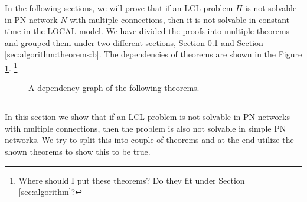 
In the following sections, we will prove that if an LCL problem $\Pi$ is not solvable in PN network $N$ with multiple connections, then it is not solvable in constant time in the LOCAL model.
We have divided the proofs into multiple theorems and grouped them under two different sections, Section \ref{sec:algorithm:theorems:a} and Section \ref{sec:algorithm:theorems:b}.
The dependencies of theorems are shown in the Figure \ref{fig:algorithm:theorem_dependency}.
\footnote{Where should I put these theorems? Do they fit under Section \ref{sec:algorithm}?}

\begin{figure}[H]
    \centering
    \caption{A dependency graph of the following theorems.\label{fig:algorithm:theorem_dependency}}
\end{figure}

\subsection{} \label{sec:algorithm:theorems:a}
In this section we show that if an LCL problem is not solvable in PN networks with multiple connections, then the problem is also not solvable in simple PN networks.
We try to split this into couple of theorems and at the end utilize the shown theorems to show this to be true.

